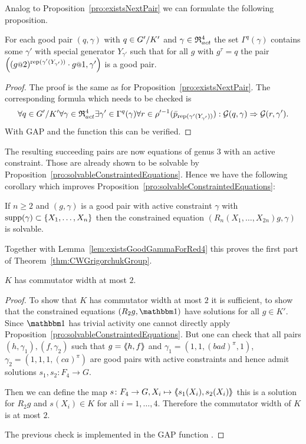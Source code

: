 \documentclass[a4paper,11pt]{amsart}
\begin{document}
Analog to Proposition~\ref{pro:existsNextPair} we can formulate the following proposition.
\begin{pro}\label{pro:existsNextPair4}
 For each good pair $(q,\gamma)$ with $q\in{G'/K'}$ and $\gamma\in\mathfrak{R}^4_{act}$ the set $\Gamma^q(\gamma)$ 
 contains some $\gamma'$ with special generator $Y_{\gamma'}$ such that for all $g$ with $g^\tau=q$ the
 pair $\left((g\at{2})^{\textup{rep}(\gamma'(Y_{\gamma'}))}\cdot g\at{1},\gamma'\right)$ is a good pair.
\end{pro}
\begin{proof}
The proof is the same as for Proposition~\ref{pro:existsNextPair}. The corresponding formula which needs to be checked is 
\[\forall q\in{G'/K'}
      \forall \gamma\in\mathfrak{R}^4_{act} 
	 \exists \gamma'\in \Gamma^q(\gamma)
	    \forall r\in \rho'^{-1}(\bar p_{\textup{rep}(\gamma'(Y_{\gamma'}))}):
	      \mathcal{G}(q,\gamma) \Rightarrow \mathcal{G}(r,\gamma').\]
 With GAP and the function  this can be verified. 
\end{proof}
The resulting succeeding pairs are now equations of genus $3$ with an active constraint. 
Those are already shown to be solvable 
by Proposition~\ref{pro:solvableConstraintedEquations}. Hence we have the following
corollary which improves Proposition~\ref{pro:solvableConstraintedEquations}:
\begin{cor}\label{cor:solvableConstraintedEquations}
If $n\geq2$ and $(g,\gamma)$ is a good pair with active constraint $\gamma$ with $\operatorname{{supp}}(\gamma)\subset\{X_1,\dotsc,X_{n}\}$
 then the constrained equation $(R_n(X_1,\dotsc,X_{2n})g,\gamma)$ is solvable. 
\end{cor}
Together with Lemma~\ref{lem:existsGoodGammaForRed4} this proves the first part of Theorem~\ref{thm:CWGrigorchukGroup}.
\begin{cor}\label{cor:KhasCW2}
 $K$ has commutator width at most $2$. 
\end{cor}
\begin{proof}
 To show that $K$ has commutator width at most $2$ it is sufficient, to show that 
 the constrained equations $(R_2g,\id)$ have solutions for all $g\in K'$. 
 Since $\id$ has trivial activity one cannot directly apply 
 Proposition~\ref{pro:solvableConstraintedEquations}.  But one can check that all 
 pairs $(h,\gamma_1),(f,\gamma_2)$ such that $g=\langle\negthickspace\langle h,f\rangle\negthickspace\rangle$ and
 $\gamma_1=(1,1,(bad)^\pi,1)$, $\gamma_2=(1,1,1,(ca)^\pi)$ are good pairs with active
 constraints and hence admit solutions $s_1,s_2\colon F_4\to G$.
 
 Then we can define the map $s\colon F_4\to G, X_i\mapsto \langle\negthickspace\langle s_1(X_i),s_2(X_i)\rangle\negthickspace\rangle$ this is a solution
 for $R_2g$ and $s(X_i)\in K$ for all $i=1,\dotsc,4$. Therefore the commutator width of $K$ is at most $2$.
 
 The previous check is implemented in the GAP function . 
\end{proof}
\end{document}
